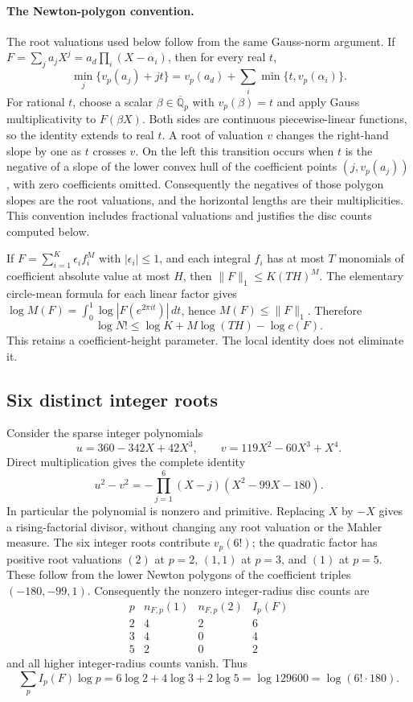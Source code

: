 \paragraph{The Newton-polygon convention.}
The root valuations used below follow from the same Gauss-norm
argument. If $F=\sum_j a_jX^j=a_d\prod_i(X-\alpha_i)$, then
for every real $t$,
\[
 \min_j\{v_p(a_j)+jt\}
 =v_p(a_d)+\sum_i\min\{t,v_p(\alpha_i)\}.
\]
For rational $t$, choose a scalar $\beta\in\overline{\mathbb Q}_p$
with $v_p(\beta)=t$ and apply Gauss multiplicativity to $F(\beta X)$.
Both sides are continuous piecewise-linear functions, so the identity
extends to real $t$. A root of valuation $v$ changes the right-hand
slope by one as $t$ crosses $v$. On the left this transition occurs
when $t$ is the negative of a slope of the lower convex hull of
the coefficient points $(j,v_p(a_j))$, with zero coefficients omitted.
Consequently the negatives of those polygon slopes are the root
valuations, and the horizontal lengths are their multiplicities.
This convention includes fractional valuations and justifies the
disc counts computed below.

If $F=\sum_{i=1}^{K}\epsilon_i f_i^M$ with $|\epsilon_i|\le1$,
and each integral $f_i$ has at most $T$ monomials of coefficient
absolute value at most $H$, then $\|F\|_1\le K(TH)^M$.
The elementary circle-mean formula for each linear
factor gives $\log M(F)=\int_0^1\log|F(e^{2\pi it})|\,dt$,
hence $M(F)\le\|F\|_1$. Therefore
\[
 \log N!\le\log K+M\log(TH)-\log c(F).
\]
This retains a coefficient-height parameter. The local identity
does not eliminate it.

\subsection{Six distinct integer roots}
Consider the sparse integer polynomials
\[
 u=360-342X+42X^3,\qquad v=119X^2-60X^3+X^4.
\]
Direct multiplication gives the complete identity
\[
 u^2-v^2=-\prod_{j=1}^6(X-j)(X^2-99X-180).
\]
In particular the polynomial is nonzero and primitive. Replacing
$X$ by $-X$ gives a rising-factorial divisor, without changing any
root valuation or the Mahler measure.
The six integer roots contribute $v_p(6!)$; the quadratic factor
has positive root valuations $(2)$ at $p=2$, $(1,1)$ at $p=3$,
and $(1)$ at $p=5$. These follow from the lower Newton polygons
of the coefficient triples $(-180,-99,1)$.
Consequently the nonzero integer-radius disc counts are
\[
\begin{array}{c|c|c|c}
 p&n_{F,p}(1)&n_{F,p}(2)&I_p(F)\\\hline
 2&4&2&6\\
 3&4&0&4\\
 5&2&0&2
\end{array}
\]
and all higher integer-radius counts vanish. Thus
\[
 \sum_p I_p(F)\log p
 =6\log2+4\log3+2\log5=\log129600=\log(6!\cdot180).
\]

